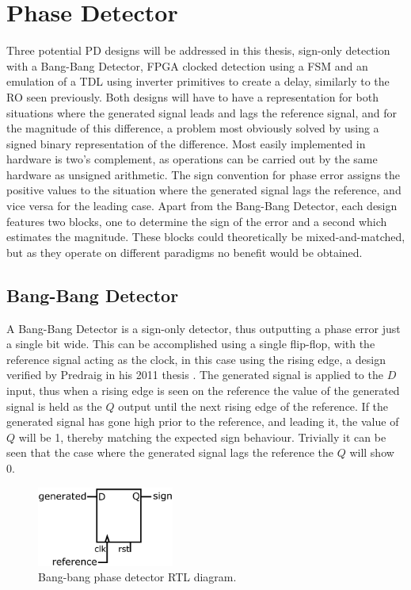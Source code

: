 \section{Phase Detector}
Three potential \acl{PD} designs will be addressed in this thesis, sign-only detection with a Bang-Bang Detector, \ac{FPGA} clocked detection using a \ac{FSM} and an emulation of a \ac{TDL} using inverter primitives to create a delay, similarly to the \ac{RO} seen previously. Both designs will have to have a representation for both situations where the generated signal leads and lags the reference signal, and for the magnitude of this difference, a problem most obviously solved by using a signed binary representation of the difference. Most easily implemented in hardware is two's complement, as operations can be carried out by the same hardware as unsigned arithmetic. The sign convention for phase error assigns the positive values to the situation where the generated signal lags the reference, and vice versa for the leading case. Apart from the Bang-Bang Detector, each design features two blocks, one to determine the sign of the error and a second which estimates the magnitude. These blocks could theoretically be mixed-and-matched, but as they operate on different paradigms no benefit would be obtained.

\subsection{Bang-Bang Detector}
A Bang-Bang Detector is a sign-only detector, thus outputting a phase error just a single bit wide. This can be accomplished using a single flip-flop, with the reference signal acting as the clock, in this case using the rising edge, a design verified by Predraig in his 2011 thesis \cite{predraig}. The generated signal is applied to the $D$ input, thus when a rising edge is seen on the reference the value of the generated signal is held as the $Q$ output until the next rising edge of the reference. If the generated signal has gone high prior to the reference, and leading it, the value of $Q$ will be 1, thereby matching the expected sign behaviour. Trivially it can be seen that the case where the generated signal lags the reference the $Q$ will show 0.
\begin{figure}[h]
	\centering
	\includegraphics[width=0.4\textwidth]{../BB}
	\caption[Bang-bang phase detector \ac{RTL} diagram]{Bang-bang phase detector \ac{RTL} diagram.}
	\label{fig:bang_bang}
\end{figure}

